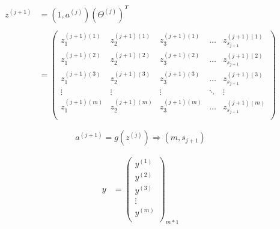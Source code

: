 \begin{equation}\begin{aligned}
	z^{(j+1)} &= (1, a^{(j)}) (\Theta^{(j)})^T \\
		\\ &= 
			\left(\begin{matrix}
				z_1^{(j+1)(1)} & z_2^{(j+1)(1)} & z_3^{(j+1)(1)} & \dots & z_{s_{j+1}}^{(j+1)(1)} \\
				z_1^{(j+1)(2)} & z_2^{(j+1)(2)} & z_3^{(j+1)(2)} & \dots & z_{s_{j+1}}^{(j+1)(2)} \\
				z_1^{(j+1)(3)} & z_2^{(j+1)(3)} & z_3^{(j+1)(3)} & \dots & z_{s_{j+1}}^{(j+1)(3)} \\
				\vdots & \vdots & \vdots & \ddots & \vdots \\
				z_1^{(j+1)(m)} & z_2^{(j+1)(m)} & z_3^{(j+1)(m)} & \dots & z_{s_{j+1}}^{(j+1)(m)} \\
			\end{matrix}\right)
\end{aligned}\end{equation}

\begin{equation}
	a^{(j+1)} = g(z^{(j)})  \Rightarrow {(m,s_{j+1})} 
\end{equation}


\begin{equation} \begin{aligned}
	y & = \left(\begin{matrix}
			y^{(1)} \\ y^{(2)} \\ y^{(3)} \\ \vdots \\ y^{(m)} \\
		\end{matrix}\right)_{m*1}
\end{aligned} \end{equation}
